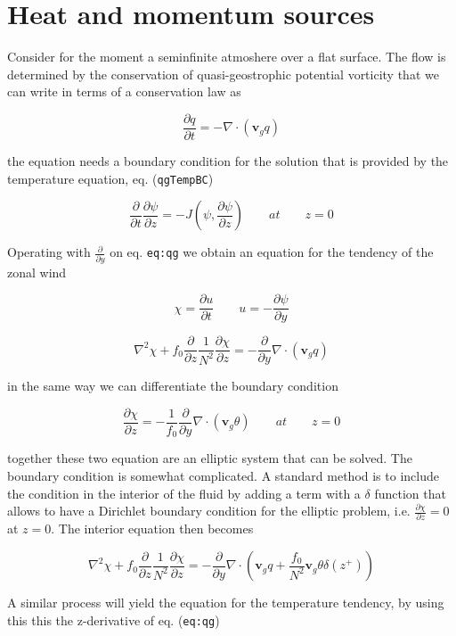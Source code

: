\section{Heat and momentum sources}\label{heat-and-momentum-sources}

Consider for the moment a seminfinite atmoshere over a flat surface. The
flow is determined by the conservation of quasi-geostrophic potential
vorticity that we can write in terms of a conservation law as

\[\frac{\partial q}{\partial t} = -\nabla\cdot(\mathbf{v}_g q)\]

the equation needs a boundary condition for the solution that is
provided by the temperature equation, eq. (\texttt{qgTempBC})

\[\frac{\partial }{\partial t}\frac{\partial \psi}{\partial z} = -J(\psi, \frac{\partial \psi}{\partial z}) \qquad  at  \qquad z=0\]

Operating with \(\frac{\partial }{\partial y}\) on eq. \texttt{eq:qg} we
obtain an equation for the tendency of the zonal wind

\[\chi = \frac{\partial u}{\partial t} \qquad u =-\frac{\partial \psi}{\partial y}\]

\[\nabla^2 \chi + f_0\frac{\partial }{\partial z}\frac{1}{N^2}\frac{\partial \chi}{\partial z} = -\frac{\partial }{\partial y} \nabla\cdot(\mathbf{v}_g q)\]

in the same way we can differentiate the boundary condition

\[\frac{\partial \chi}{\partial z}= -\frac{1}{f_0}\frac{\partial }{\partial y} \nabla\cdot(\mathbf{v}_g \theta) \qquad  at  \qquad z=0\]

together these two equation are an elliptic system that can be solved.
The boundary condition is somewhat complicated. A standard method is to
include the condition in the interior of the fluid by adding a term with
a \(\delta\) function that allows to have a Dirichlet boundary condition
for the elliptic problem, i.e. \(\frac{\partial \chi}{\partial z} = 0\)
at \(z=0\). The interior equation then becomes

\[\nabla^2 \chi + f_0\frac{\partial }{\partial z}\frac{1}{N^2}\frac{\partial \chi}{\partial z} = -\frac{\partial }{\partial y} \nabla\cdot\left( \mathbf{v}_g q +\frac{f_0}{N^2} \mathbf{v}_g\theta \delta(z^+) \right)\]

A similar process will yield the equation for the temperature tendency,
by using this this the z-derivative of eq. (\texttt{eq:qg})

